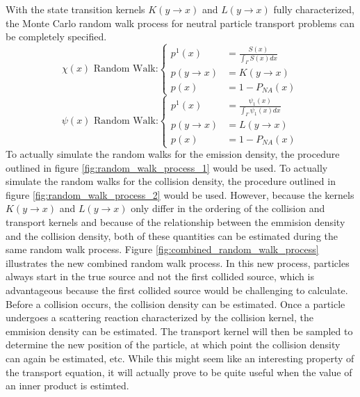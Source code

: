 With the state transition kernels $K(y \to x)$ and $L(y \to x)$ fully 
characterized, the Monte Carlo random walk process for neutral particle 
transport problems can be completely specified.
\begin{equation}
  \chi(x)\text{ Random Walk:}
  \begin{cases}
    p^1(x) & = \frac{S(x)}{\int_{\Gamma} S(x)dx} \\
    p(y \to x) &  = K(y \to x) \\
    p(x) & = 1 - P_{NA}(x)
  \end{cases}
  \label{eq:mc_random_walk_emission_dens}
\end{equation}
\begin{equation}
  \psi(x)\text{ Random Walk:}
  \begin{cases}
    p^1(x) & = \frac{\psi_1(x)}{\int_{\Gamma}\psi_1(x)dx} \\
    p(y \to x) & = L(y \to x) \\
    p(x) & = 1 - P_{NA}(x)
  \end{cases}
  \label{eq:mc_random_walk_collision_dens}
\end{equation}
To actually simulate the random walks for the emission density, the procedure
outlined in figure \ref{fig:random_walk_process_1} would be used. To
actually simulate the random walks for the collision density, the procedure
outlined in figure \ref{fig:random_walk_process_2} would be used. However,
because the kernels $K(y \to x)$ and $L(y \to x)$ only differ in the ordering
of the collision and transport kernels and because of the relationship between
the emmision density and the collision density, both of these quantities can
be estimated during the same random walk process. Figure 
\ref{fig:combined_random_walk_process} illustrates the new combined random
walk process. In this new process, particles always start in the true source
and not the first collided source, which is advantageous because the first 
collided source would be challenging to calculate. Before a collision occurs,
the collision density can be estimated. Once a particle undergoes a scattering
reaction characterized by the collision kernel, the emmision density can be
estimated. The transport kernel will then be sampled to determine the new
position of the particle, at which point the collision density can again be
estimated, etc. While this might seem like an interesting property of the 
transport equation, it will actually prove to be quite useful when the value
of an inner product is estimted.

